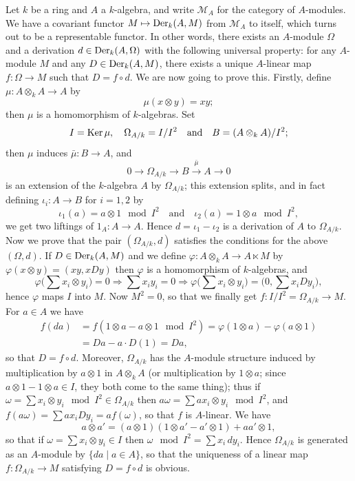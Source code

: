 Let $k$ be a ring and $A$ a $k$-algebra, and write $\mathcal{M}_A$ for the category of
$A$-modules. We have a covariant functor $M \mapsto \operatorname{Der}_k(A, M)$ from $\mathcal{M}_A$ to
itself, which turns out to be a representable functor. In other words, there
exists an $A$-module $\Omega$ and a derivation $d \in \operatorname{Der}_k(A, \Omega)$ with the following
universal property: for any $A$-module $M$ and any $D \in \operatorname{Der}_k(A, M)$, there exists
a unique $A$-linear map $f\colon \Omega \to M$ such that $D = f \circ d$. We are now going
to prove this. Firstly, define $\mu\colon A \otimes_k A \to A$ by
\[
  \mu(x \otimes y) = xy;
\]
then $\mu$ is a homomorphism of $k$-algebras. Set
\[
  I = \operatorname{Ker} \mu, \quad \Omega_{A/k} = I/I^2 \quad \text{and} \quad B = (A \otimes_k A)/I^2;
\]
then $\mu$ induces $\bar{\mu}\colon B \to A$, and
\[
  0 \to \Omega_{A/k} \to B \xrightarrow{\bar{\mu}} A \to 0
\]
is an extension of the $k$-algebra $A$ by $\Omega_{A/k}$; this extension splits, and in
fact defining $\iota_i\colon A \to B$ for $i = 1, 2$ by
\[
  \iota_1(a) = a \otimes 1 \mod I^2 \quad \text{and} \quad \iota_2(a) = 1 \otimes a \mod I^2,
\]
we get two liftings of $1_A\colon A \to A$. Hence $d = \iota_1 - \iota_2$ is a derivation of
$A$ to $\Omega_{A/k}$. Now we prove that the pair $(\Omega_{A/k}, d)$ satisfies the
conditions for the above $(\Omega, d)$. If $D \in \operatorname{Der}_k(A, M)$ and we define
$\varphi\colon A \otimes_k A \to A \ltimes M$ by $\varphi(x \otimes y) = (xy, xDy)$ then
$\varphi$ is a homomorphism of $k$-algebras, and
\[
  \varphi\Big(\sum x_i \otimes y_i\Big) = 0 \Rightarrow \sum x_iy_i = 0
      \Rightarrow \varphi\Big(\sum x_i \otimes y_i\Big) = \Big(0, \sum x_iDy_i\Big),
\]
hence $\varphi$ maps $I$ into $M$. Now $M^2 = 0$, so that we finally get
$f\colon I/I^2 = \Omega_{A/k} \to M$. For $a \in A$ we have
\begin{align*}
  f(da) &= f(1 \otimes a - a \otimes 1 \mod I^2) = \varphi(1 \otimes a) - \varphi(a \otimes 1) \\
        &= Da - a \cdot D(1) = Da,
\end{align*}
so that $D = f \circ d$. Moreover, $\Omega_{A/k}$ has the $A$-module structure induced by
multiplication by $a \otimes 1$ in $A \otimes_k A$ (or multiplication by $1 \otimes a$; since
$a \otimes 1 - 1 \otimes a \in I$, they both come to the same thing); thus if
$\omega = \sum x_i \otimes y_i \mod I^2 \in \Omega_{A/k}$ then
$a\omega = \sum ax_i \otimes y_i \mod I^2$, and $f(a\omega) = \sum ax_iDy_i =
a f(\omega)$, so that $f$ is $A$-linear. We have
\[
  a \otimes a' = (a \otimes 1)(1 \otimes a' - a' \otimes 1) + aa' \otimes 1,
\]
so that if $\omega = \sum x_i \otimes y_i \in I$ then $\omega \mod I^2 = \sum x_i\,dy_i$.
Hence $\Omega_{A/k}$ is generated as an $A$-module by $\{da \mid a \in A\}$, so that the
uniqueness of a linear map $f\colon \Omega_{A/k} \to M$ satisfying $D = f \circ d$ is
obvious.

